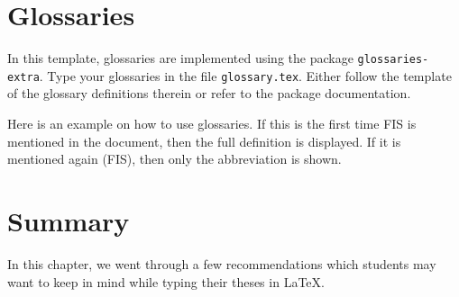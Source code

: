 \section{Glossaries}
In this template, glossaries are implemented using the package \texttt{glossaries-extra}. Type your glossaries in the file \texttt{glossary.tex}. Either follow the template of the glossary definitions therein or refer to the package documentation.

Here is an example on how to use glossaries. If this is the first time \Gls{FIS} is mentioned in the document, then the full definition is displayed. If it is mentioned again (\Gls{FIS}), then only the abbreviation is shown.




\section{Summary}
In this chapter, we went through a few recommendations which students may want to keep in mind while typing their theses in \LaTeX. 